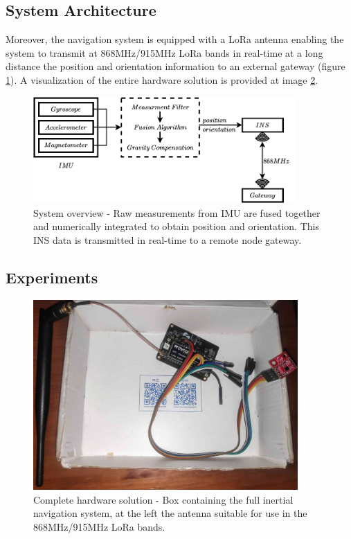 \subsection{System Architecture}
Moreover, the navigation system is equipped with a LoRa antenna enabling the system to transmit at 868MHz/915MHz LoRa bands in real-time at a long distance the position and orientation information to an external gateway (figure \ref{fig:overview}). A visualization of the entire hardware solution is provided at image \ref{fig:full}.

\begin{figure}[!h]
    \centering
    \includegraphics[width=0.9\textwidth]{figures/overview.pdf}
    \caption{System overview - Raw measurements from IMU are fused together and numerically integrated to obtain position and orientation. This INS data is transmitted in real-time to a remote node gateway. }
    \label{fig:overview}
\end{figure}

\subsection{Experiments}

\begin{figure}[!h]
    \centering
    \includegraphics[width=0.9\textwidth]{figures/fullINS.jpg}
    \caption{Complete hardware solution - Box containing the full inertial navigation system, at the left the antenna  suitable for use in the 868MHz/915MHz LoRa bands. }
    \label{fig:full}
\end{figure}
